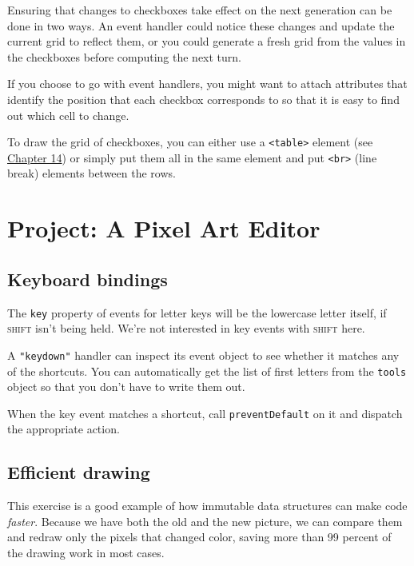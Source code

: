 Ensuring that changes to checkboxes take effect on the next generation can be done in two ways. An event handler could notice these changes and update the current grid to reflect them, or you could generate a fresh grid from the values in the checkboxes before computing the next turn.

If you choose to go with event handlers, you might want to attach attributes that identify the position that each checkbox corresponds to so that it is easy to find out which cell to change.

To draw the grid of checkboxes, you can either use a \lstinline`<table>` element (see \hyperref[dom.exercise_table]{Chapter 14}) or simply put them all in the same element and put \lstinline`<br>` (line break) elements between the rows.

\section{Project: A Pixel Art Editor}

\subsection{Keyboard bindings}

The \lstinline`key` property of events for letter keys will be the lowercase letter itself, if \textsc{shift} isn't being held. We're not interested in key events with \textsc{shift} here.

A \lstinline`"keydown"` handler can inspect its event object to see whether it matches any of the shortcuts. You can automatically get the list of first letters from the \lstinline`tools` object so that you don't have to write them out.

When the key event matches a shortcut, call \lstinline`preventDefault` on it and dispatch the appropriate action.

\subsection{Efficient drawing}

This exercise is a good example of how immutable data structures can make code \emph{faster}. Because we have both the old and the new picture, we can compare them and redraw only the pixels that changed color, saving more than 99 percent of the drawing work in most cases.

